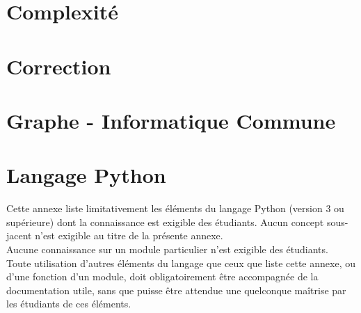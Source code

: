 \documentclass[book]{magnolia}
\begin{document}
% 
% 

\chapter{Complexité}
\setcounter{numeroexercicecours}{1}

% 

\chapter{Correction}
\setcounter{numeroexercicecours}{1}

% 


\chapter{Graphe - Informatique Commune}
\setcounter{numeroexercicecours}{1}



\chapter{Langage Python}
Cette annexe liste limitativement les éléments du langage Python (version 3 ou supérieure) dont la connaissance est exigible des étudiants. Aucun concept sous-jacent n'est exigible au titre de la présente annexe.\\

Aucune connaissance sur un module particulier n'est exigible des étudiants.\\

Toute utilisation d'autres éléments du langage que ceux que liste cette annexe, ou d'une fonction d'un module, doit obligatoirement être accompagnée de la documentation utile, sans que puisse être attendue une quelconque maîtrise par les étudiants de ces éléments.
\end{document}
